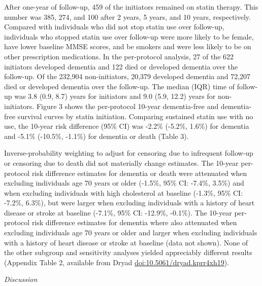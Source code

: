 \documentclass[
]{book}
\begin{document}
After one-year of follow-up, 459 of the initiators remained on statin therapy. This number was 385, 274, and 100 after 2 years, 5 years, and 10 years, respectively. Compared with individuals who did not stop statin use over follow-up, individuals who stopped statin use over follow-up were more likely to be female, have lower baseline MMSE scores, and be smokers and were less likely to be on other prescription medications. In the per-protocol analysis, 27 of the 622 initiators developed dementia and 122 died or developed dementia over the follow-up. Of the 232,904 non-initiators, 20,379 developed dementia and 72,207 died or developed dementia over the follow-up. The median (IQR) time of follow-up was 3.8 (0.9, 8.7) years for initiators and 9.0 (5.9, 12.2) years for non-initiators. Figure 3 shows the per-protocol 10-year dementia-free and dementia-free survival curves by statin initiation. Comparing sustained statin use with no use, the 10-year risk difference (95\% CI) was -2.2\% (-5.2\%, 1.6\%) for dementia and -5.1\% (-10.5\%, -1.1\%) for dementia or death (Table 3).

Inverse-probability weighting to adjust for censoring due to infrequent follow-up or censoring due to death did not materially change estimates. The 10-year per-protocol risk difference estimates for dementia or death were attenuated when excluding individuals age 70 years or older (-1.5\%, 95\% CI: -7.4\%, 3.5\%) and when excluding individuals with high cholesterol at baseline (-1.3\%, 95\% CI: -7.2\%, 6.3\%), but were larger when excluding individuals with a history of heart disease or stroke at baseline (-7.1\%, 95\% CI: -12.9\%, -0.1\%). The 10-year per-protocol risk difference estimates for dementia where also attenuated when excluding individuals age 70 years or older and larger when excluding individuals with a history of heart disease or stroke at baseline (data not shown). None of the other subgroup and sensitivity analyses yielded appreciably different results (Appendix Table 2, available from Dryad \url{doi:10.5061/dryad.kprr4xh19}).

\emph{Discussion}
\end{document}
